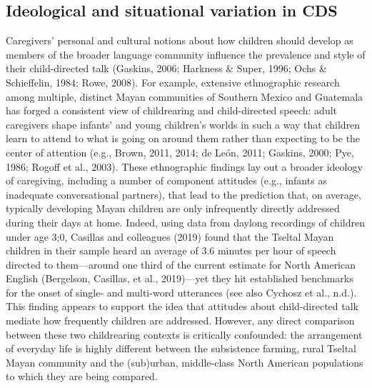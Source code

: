 \documentclass[
  english,
  ,man,floatsintext]{apa6}
\begin{document}
\hypertarget{ideological-and-situational-variation-in-cds}{%
\subsection{Ideological and situational variation in CDS}\label{ideological-and-situational-variation-in-cds}}

Caregivers' personal and cultural notions about how children should develop as members of the broader language community influence the prevalence and style of their child-directed talk (Gaskins, 2006; Harkness \& Super, 1996; Ochs \& Schieffelin, 1984; Rowe, 2008). For example, extensive ethnographic research among multiple, distinct Mayan communities of Southern Mexico and Guatemala has forged a consistent view of childrearing and child-directed speech: adult caregivers shape infants' and young children's worlds in such a way that children learn to attend to what is going on around them rather than expecting to be the center of attention (e.g., Brown, 2011, 2014; de León, 2011; Gaskins, 2000; Pye, 1986; Rogoff et al., 2003). These ethnographic findings lay out a broader ideology of caregiving, including a number of component attitudes (e.g., infants as inadequate conversational partners), that lead to the prediction that, on average, typically developing Mayan children are only infrequently directly addressed during their days at home. Indeed, using data from daylong recordings of children under age 3;0, Casillas and colleagues (2019) found that the Tseltal Mayan children in their sample heard an average of 3.6 minutes per hour of speech directed to them---around one third of the current estimate for North American English (Bergelson, Casillas, et al., 2019)---yet they hit established benchmarks for the onset of single- and multi-word utterances (see also Cychosz et al., n.d.). This finding appears to support the idea that attitudes about child-directed talk mediate how frequently children are addressed. However, any direct comparison between these two childrearing contexts is critically confounded: the arrangement of everyday life is highly different between the subsistence farming, rural Tseltal Mayan community and the (sub)urban, middle-class North American populations to which they are being compared.
\end{document}
